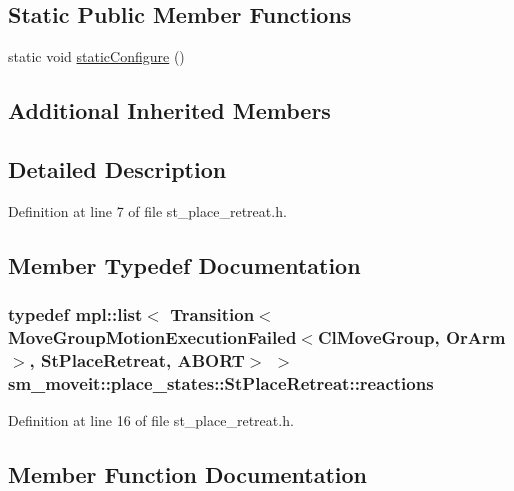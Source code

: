 \subsection*{Static Public Member Functions}
\begin{DoxyCompactItemize}
\item 
static void \hyperlink{structsm__moveit_1_1place__states_1_1StPlaceRetreat_a6f2a55cf2350568bf054c20eb9a59c94}{static\+Configure} ()
\end{DoxyCompactItemize}
\subsection*{Additional Inherited Members}


\subsection{Detailed Description}


Definition at line 7 of file st\+\_\+place\+\_\+retreat.\+h.



\subsection{Member Typedef Documentation}
\subsubsection[{\texorpdfstring{reactions}{reactions}}]{\setlength{\rightskip}{0pt plus 5cm}typedef mpl\+::list$<$ Transition$<${\bf Move\+Group\+Motion\+Execution\+Failed}$<${\bf Cl\+Move\+Group}, {\bf Or\+Arm}$>$, {\bf St\+Place\+Retreat}, {\bf A\+B\+O\+RT}$>$ $>$ {\bf sm\+\_\+moveit\+::place\+\_\+states\+::\+St\+Place\+Retreat\+::reactions}}\hypertarget{structsm__moveit_1_1place__states_1_1StPlaceRetreat_a63015ae143e5815bb2c3fb4a2f3dc16d}{}\label{structsm__moveit_1_1place__states_1_1StPlaceRetreat_a63015ae143e5815bb2c3fb4a2f3dc16d}


Definition at line 16 of file st\+\_\+place\+\_\+retreat.\+h.



\subsection{Member Function Documentation}
